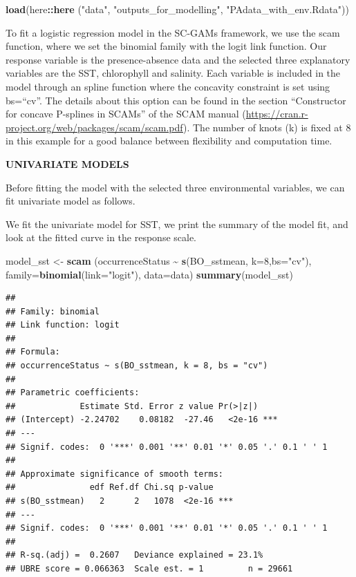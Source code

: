 \documentclass[
]{book}
\newenvironment{Shaded}{\begin{snugshade}}{\end{snugshade}}
\newcommand{\AttributeTok}[1]{\textcolor[rgb]{0.13,0.29,0.53}{#1}}
\newcommand{\DecValTok}[1]{\textcolor[rgb]{0.00,0.00,0.81}{#1}}
\newcommand{\FunctionTok}[1]{\textcolor[rgb]{0.13,0.29,0.53}{\textbf{#1}}}
\newcommand{\NormalTok}[1]{#1}
\newcommand{\OtherTok}[1]{\textcolor[rgb]{0.56,0.35,0.01}{#1}}
\newcommand{\SpecialCharTok}[1]{\textcolor[rgb]{0.81,0.36,0.00}{\textbf{#1}}}
\newcommand{\StringTok}[1]{\textcolor[rgb]{0.31,0.60,0.02}{#1}}
\begin{document}
\begin{Shaded}
\begin{Highlighting}[]
\FunctionTok{load}\NormalTok{(here}\SpecialCharTok{::}\FunctionTok{here}\NormalTok{ (}\StringTok{"data"}\NormalTok{, }\StringTok{"outputs\_for\_modelling"}\NormalTok{, }\StringTok{"PAdata\_with\_env.Rdata"}\NormalTok{))}
\end{Highlighting}
\end{Shaded}

To fit a logistic regression model in the SC-GAMs framework, we use the scam function, where we set the binomial family with the logit link function. Our response variable is the presence-absence data and the selected three explanatory variables are the SST, chlorophyll and salinity. Each variable is included in the model through an spline function where the concavity constraint is set using bs=``cv''. The details about this option can be found in the section ``Constructor for concave P-splines in SCAMs'' of the SCAM manual (\url{https://cran.r-project.org/web/packages/scam/scam.pdf}). The number of knots (k) is fixed at 8 in this example for a good balance between flexibility and computation time.

\textbf{UNIVARIATE MODELS}

Before fitting the model with the selected three environmental variables, we can fit univariate model as follows.

We fit the univariate model for SST, we print the summary of the model fit, and look at the fitted curve in the response scale.

\begin{Shaded}
\begin{Highlighting}[]
\NormalTok{model\_sst }\OtherTok{\textless{}{-}} \FunctionTok{scam}\NormalTok{ (occurrenceStatus }\SpecialCharTok{\textasciitilde{}}  \FunctionTok{s}\NormalTok{(BO\_sstmean, }\AttributeTok{k=}\DecValTok{8}\NormalTok{,}\AttributeTok{bs=}\StringTok{"cv"}\NormalTok{), }\AttributeTok{family=}\FunctionTok{binomial}\NormalTok{(}\AttributeTok{link=}\StringTok{"logit"}\NormalTok{), }\AttributeTok{data=}\NormalTok{data)}
\FunctionTok{summary}\NormalTok{(model\_sst)}
\end{Highlighting}
\end{Shaded}

\begin{verbatim}
## 
## Family: binomial 
## Link function: logit 
## 
## Formula:
## occurrenceStatus ~ s(BO_sstmean, k = 8, bs = "cv")
## 
## Parametric coefficients:
##             Estimate Std. Error z value Pr(>|z|)    
## (Intercept) -2.24702    0.08182  -27.46   <2e-16 ***
## ---
## Signif. codes:  0 '***' 0.001 '**' 0.01 '*' 0.05 '.' 0.1 ' ' 1
## 
## Approximate significance of smooth terms:
##               edf Ref.df Chi.sq p-value    
## s(BO_sstmean)   2      2   1078  <2e-16 ***
## ---
## Signif. codes:  0 '***' 0.001 '**' 0.01 '*' 0.05 '.' 0.1 ' ' 1
## 
## R-sq.(adj) =  0.2607   Deviance explained = 23.1%
## UBRE score = 0.066363  Scale est. = 1         n = 29661
\end{verbatim}
\end{document}
